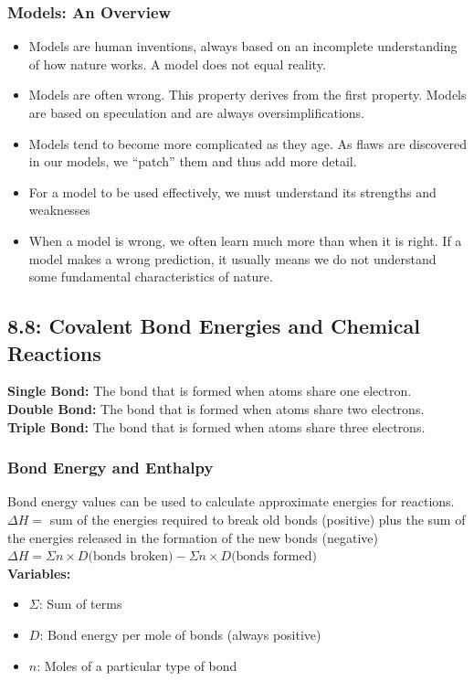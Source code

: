 \documentclass[12pt]{extarticle}
\begin{document}
\subsubsection*{Models: An Overview}
\begin{itemize}
    \item Models are human inventions, always based on an incomplete understanding of how nature works. A model does not equal reality.
    \item Models are often wrong. This property derives from the first property. Models are based on speculation and are always oversimplifications.
    \item Models tend to become more complicated as they age. As flaws are discovered in our models, we “patch” them and thus add more detail.
    \item For a model to be used effectively, we must understand its strengths and weaknesses
    \item When a model is wrong, we often learn much more than when it is right. If a model makes a wrong prediction, it usually means we do not understand some fundamental characteristics of nature. 
\end{itemize}

\subsection*{8.8: Covalent Bond Energies and Chemical Reactions}
\textbf{Single Bond:}
The bond that is formed when atoms share one electron.
\\\textbf{Double Bond:}
The bond that is formed when atoms share two electrons.
\\\textbf{Triple Bond:}
The bond that is formed when atoms share three electrons.
\subsubsection{Bond Energy and Enthalpy}
Bond energy values can be used to calculate approximate energies for reactions.
\\$\Delta H = $ sum of the energies required to break old bonds (positive) plus the sum of the energies released in the formation of the new bonds (negative)
\\$\Delta H = \Sigma n \times D \text{(bonds broken)} - \Sigma n \times D \text{(bonds formed)}$
\\\textbf{Variables:}
\begin{itemize}[label={}]
    \item $\Sigma$: Sum of terms
    \item $D$: Bond energy per mole of bonds (always positive)
    \item $n$: Moles of a particular type of bond
\end{itemize}
\end{document}
